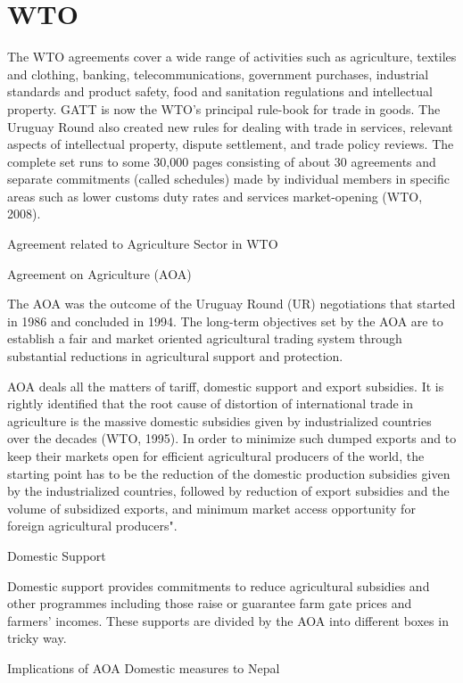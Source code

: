 \documentclass[
  openany]{book}
\begin{document}
\hypertarget{wto}{%
\section{WTO}\label{wto}}

The WTO agreements cover a wide range of activities such as agriculture, textiles and clothing, banking, telecommunications, government purchases, industrial standards and product safety, food and sanitation regulations and intellectual property. GATT is now the WTO's principal rule-book for trade in goods. The Uruguay Round also created new rules for dealing with trade in services, relevant aspects of intellectual property, dispute settlement, and trade policy reviews. The complete set runs to some 30,000 pages consisting of about 30 agreements and separate commitments (called schedules) made by individual members in specific areas such as lower customs duty rates and services market-opening (WTO, 2008).

Agreement related to Agriculture Sector in WTO

Agreement on Agriculture (AOA)

The AOA was the outcome of the Uruguay Round (UR) negotiations that started in 1986 and concluded in 1994. The long-term objectives set by the AOA are to establish a fair and market oriented agricultural trading system through substantial reductions in agricultural support and protection.

AOA deals all the matters of tariff, domestic support and export subsidies. It is rightly identified that the root cause of distortion of international trade in agriculture is the massive domestic subsidies given by industrialized countries over the decades (WTO, 1995). In order to minimize such dumped exports and to keep their markets open for efficient agricultural producers of the world, the starting point has to be the reduction of the domestic production subsidies given by the industrialized countries, followed by reduction of export subsidies and the volume of subsidized exports, and minimum market access opportunity for foreign agricultural producers".

Domestic Support

Domestic support provides commitments to reduce agricultural subsidies and other programmes including those raise or guarantee farm gate prices and farmers' incomes. These supports are divided by the AOA into different boxes in tricky way.

Implications of AOA Domestic measures to Nepal
\end{document}
